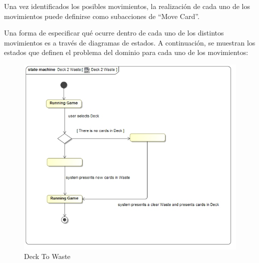 \documentclass[11pt]{article}
\begin{document}
Una vez identificados los posibles movimientos, la realización de cada uno de los movimientos puede definirse como subacciones de ``Move Card''.

Una forma de especificar qué ocurre dentro de cada uno de los distintos movimientos es a través de diagramas de estados. A continuación, se muestran los estados que definen el problema del dominio para cada uno de los movimientos:

\begin{center}
 \begin{figure}[H]
 \begin{center}
   \includegraphics[width=14cm]{DomainModel/Deck2Waste.jpg}
   \caption{Deck To Waste}
   \label{fig:deck2waste}
 \end{center}
 \end{figure}
\end{center}
\end{document}
